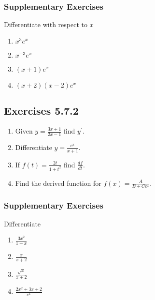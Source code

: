 \subsubsection{Supplementary Exercises}
Differentiate with respect to $x$ 


\begin{enumerate}
	\item $x^{3} e^{x}$ 
	
	\item $x^{ -3} e^{x}$ 
	
	\item $\left (x +1\right ) e^{x}$ 
	
	\item $\left (x +2\right ) \left (x -2\right ) e^{x}$ \end{enumerate}


\subsection{Exercises 5.7.2}
\begin{enumerate}
	\item Given $y =\frac{3 x +1}{2 x -1}$ find $y^{ \prime }$. 
	
	\item Differentiate $y =\frac{e^{x}}{x +1}$. 
	
	\item If $f (t) =\frac{2 t}{1 +t^{2}}$ find $\frac{d f}{d t}$. 
	
	\item Find the derived function for $f (x) =\frac{A}{B +C e^{x}}$. \end{enumerate}


\subsubsection{Supplementary Exercises}
Differentiate 


\begin{enumerate}
	\item $\frac{3 x^{2}}{1 -x}$ 
	
	\item $\frac{x}{x +2}$ 
	
	\item $\frac{\sqrt{x}}{x +2}$ 
	
	\item $\frac{2 x^{2} +3 x +2}{e^{x}}$ \end{enumerate}


